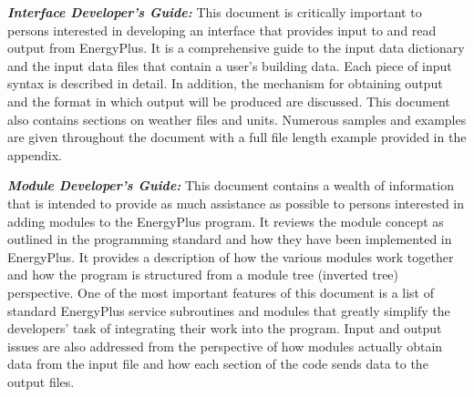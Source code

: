 \textbf{\emph{Interface Developer's Guide:}} This document is critically important to persons interested in developing an interface that provides input to and read output from EnergyPlus. It is a comprehensive guide to the input data dictionary and the input data files that contain a user's building data. Each piece of input syntax is described in detail. In addition, the mechanism for obtaining output and the format in which output will be produced are discussed. This document also contains sections on weather files and units. Numerous samples and examples are given throughout the document with a full file length example provided in the appendix.

\textbf{\emph{Module Developer's Guide:}} This document contains a wealth of information that is intended to provide as much assistance as possible to persons interested in adding modules to the EnergyPlus program. It reviews the module concept as outlined in the programming standard and how they have been implemented in EnergyPlus. It provides a description of how the various modules work together and how the program is structured from a module tree (inverted tree) perspective. One of the most important features of this document is a list of standard EnergyPlus service subroutines and modules that greatly simplify the developers' task of integrating their work into the program. Input and output issues are also addressed from the perspective of how modules actually obtain data from the input file and how each section of the code sends data to the output files.
